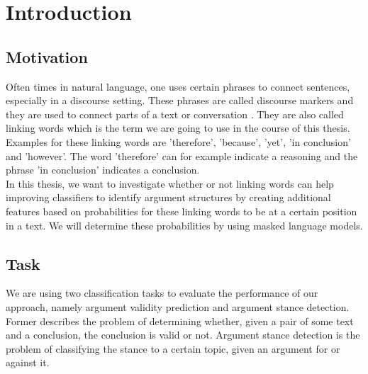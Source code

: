 \section{Introduction}
\subsection{Motivation}
Often times in natural language, one uses certain phrases to connect sentences, especially in a discourse setting. These phrases are called discourse markers and they are used to connect parts of a text or conversation \cite{Discours1999}. They are also called linking words which is the term we are going to use in the course of this thesis. Examples for these linking words are 'therefore', 'because', 'yet', 'in conclusion' and 'however'. The word 'therefore' can for example indicate a reasoning and the phrase 'in conclusion' indicates a conclusion. \\
In this thesis, we want to investigate whether or not linking words can help improving classifiers to identify argument structures by creating additional features based on probabilities for these linking words to be at a certain position in a text. We will determine these probabilities by using masked language models.
\subsection{Task}
We are using two classification tasks to evaluate the performance of our approach, namely argument validity prediction and argument stance detection. Former describes the problem of determining whether, given a pair of some text and a conclusion, the conclusion is valid or not. Argument stance detection is the problem of classifying the stance to a certain topic, given an argument for or against it. \\
